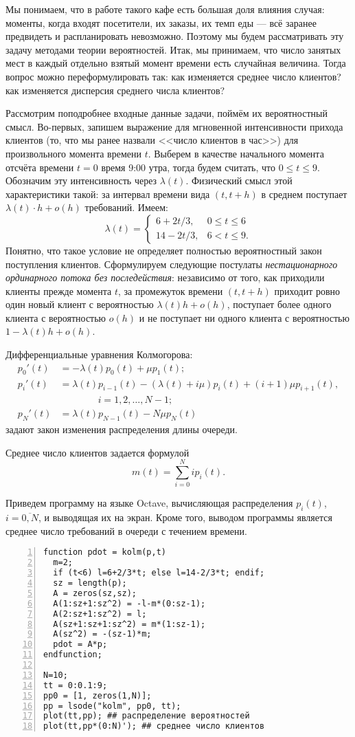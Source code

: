 \documentclass[12pt]{extarticle}
\renewcommand{\leq}{\leqslant}
\begin{document}
Мы понимаем, что в работе такого кафе есть большая доля влияния случая: моменты,
когда входят посетители, их заказы, их темп еды --- всё заранее предвидеть и
распланировать невозможно. Поэтому мы будем рассматривать эту задачу методами
теории вероятностей. Итак, мы принимаем, что число занятых мест в каждый
отдельно взятый момент времени есть случайная величина. Тогда вопрос можно
переформулировать так: как изменяется среднее число клиентов? как изменяется
дисперсия среднего числа клиентов?

Рассмотрим поподробнее входные данные задачи, поймём их вероятностный
смысл. Во-первых, запишем выражение для мгновенной интенсивности прихода
клиентов (то, что мы ранее назвали <<число клиентов в час>>) для произвольного
момента времени $t$. Выберем в качестве начального момента отсчёта времени $t=0$
время 9:00 утра, тогда будем считать, что $0\leq t\leq 9$. Обозначим эту
интенсивность через $\lambda(t)$. Физический смысл этой характеристики такой: за
интервал времени вида $(t, t+h)$ в среднем поступает $\lambda(t)\cdot h+o(h)$
требований.  Имеем:
\[
\lambda(t)=\begin{cases}
  6+2t/3,& 0\leq t\leq 6\\
  14-2t/3,& 6< t \leq 9.
\end{cases}
\]
Понятно, что такое
условие не определяет полностью вероятностный закон поступления
клиентов. Сформулируем следующие постулаты \emph{нестационарного ординарного
  потока без последействия}: независимо от того, как приходили клиенты прежде
момента $t$, за промежуток времени $(t, t+h)$ приходит ровно один новый клиент с
вероятностью $\lambda(t)h+o(h)$, поступает более одного клиента с
вероятностью $o(h)$ и не поступает ни одного клиента с вероятностью
$1-\lambda(t)h+o(h)$. 

Дифференциальные уравнения Колмогорова: 
\begin{align*}
  p_0'(t) & = -\lambda(t)p_0(t)+\mu p_1(t);\\
  p_i'(t) & = \lambda(t)p_{i-1}(t)-(\lambda(t)+i\mu)p_i(t)+(i+1)\mu
  p_{i+1}(t),\\ & \qquad \qquad i=1, 2, \ldots, N-1;\\
  p_N'(t) & = \lambda(t)p_{N-1}(t)-N\mu p_N(t)
\end{align*}
задают закон изменения распределения длины очереди.

Среднее число клиентов задается формулой
\[
m(t)=\sum_{i=0}^N i p_i(t).
\]

Приведем программу на языке Octave, вычисляющая распределения  $p_i(t)$, $i=\overline{0,N}$, и выводящая их на экран. Кроме того, выводом программы является среднее число требований в очереди с течением времени.
\begin{Verbatim}[frame=single,xleftmargin=2em,numbers=left]
function pdot = kolm(p,t)
  m=2;
  if (t<6) l=6+2/3*t; else l=14-2/3*t; endif;
  sz = length(p);
  A = zeros(sz,sz);
  A(1:sz+1:sz^2) = -l-m*(0:sz-1);
  A(2:sz+1:sz^2) = l;
  A(sz+1:sz+1:sz^2) = m*(1:sz-1);
  A(sz^2) = -(sz-1)*m;
  pdot = A*p;
endfunction;

N=10;
tt = 0:0.1:9;
pp0 = [1, zeros(1,N)];
pp = lsode("kolm", pp0, tt);
plot(tt,pp); ## распределение вероятностей
plot(tt,pp*(0:N)'); ## среднее число клиентов
\end{Verbatim}
\end{document}
